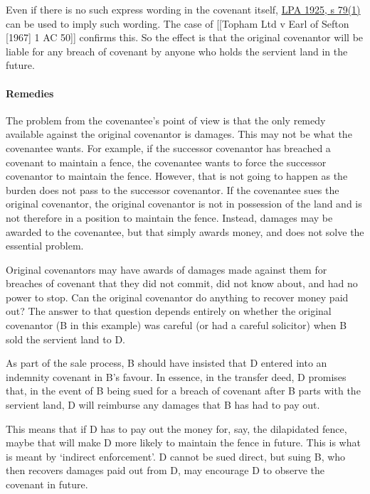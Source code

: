 \documentclass[
]{article}
\begin{document}
Even if there is no such express wording in the covenant itself,
\href{https://www.legislation.gov.uk/ukpga/Geo5/15-16/20/section/79}{LPA
1925, s 79(1)} can be used to imply such wording. The case of
{[}{[}Topham Ltd v Earl of Sefton {[}1967{]} 1 AC 50{]}{]} confirms
this. So the effect is that the original covenantor will be liable for
any breach of covenant by anyone who holds the servient land in the
future.

\hypertarget{remedies}{%
\paragraph{Remedies}\label{remedies}}

The problem from the covenantee's point of view is that the only remedy
available against the original covenantor is damages. This may not be
what the covenantee wants. For example, if the successor covenantor has
breached a covenant to maintain a fence, the covenantee wants to force
the successor covenantor to maintain the fence. However, that is not
going to happen as the burden does not pass to the successor covenantor.
If the covenantee sues the original covenantor, the original covenantor
is not in possession of the land and is not therefore in a position to
maintain the fence. Instead, damages may be awarded to the covenantee,
but that simply awards money, and does not solve the essential problem.

Original covenantors may have awards of damages made against them for
breaches of covenant that they did not commit, did not know about, and
had no power to stop. Can the original covenantor do anything to recover
money paid out? The answer to that question depends entirely on whether
the original covenantor (B in this example) was careful (or had a
careful solicitor) when B sold the servient land to D.

As part of the sale process, B should have insisted that D entered into
an indemnity covenant in B's favour. In essence, in the transfer deed, D
promises that, in the event of B being sued for a breach of covenant
after B parts with the servient land, D will reimburse any damages that
B has had to pay out.

This means that if D has to pay out the money for, say, the dilapidated
fence, maybe that will make D more likely to maintain the fence in
future. This is what is meant by `indirect enforcement'. D cannot be
sued direct, but suing B, who then recovers damages paid out from D, may
encourage D to observe the covenant in future.
\end{document}
